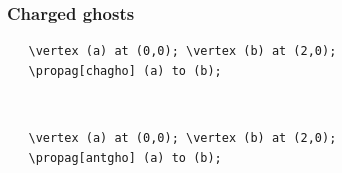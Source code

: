 \documentclass[10pt,letterpaper,twoside,notitlepage]{article}
\numberwithin{figure}{section}
\begin{document}
\subsubsection*{Charged ghosts}
%
%
\begin{minipage}{0.7\linewidth}
\vercol\begin{verbatim}
   \vertex (a) at (0,0); \vertex (b) at (2,0);
   \propag[chagho] (a) to (b);
\end{verbatim}\txcol
\end{minipage}
%
\begin{minipage}{0.25\linewidth}
\end{minipage}
\\
%
\begin{minipage}{0.7\linewidth}
\vercol\begin{verbatim}
   \vertex (a) at (0,0); \vertex (b) at (2,0);
   \propag[antgho] (a) to (b);
\end{verbatim}\txcol
\end{minipage}
%
\begin{minipage}{0.25\linewidth}
\end{minipage}
\\
%
\end{document}
